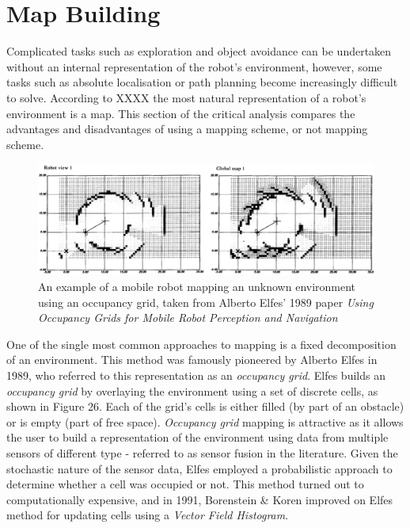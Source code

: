 \documentclass[a4paper]{article}
\begin{document}
\section{Map Building}
Complicated tasks such as exploration and object avoidance can be undertaken without an internal representation of the robot's environment, however, some tasks such as absolute localisation or path planning become increasingly difficult to solve. According to XXXX the most natural representation of a robot's environment is a map. This section of the critical analysis compares the advantages and disadvantages of using a mapping scheme, or not mapping scheme.
\begin{figure}[h]
\centering
\includegraphics[scale=0.3]{occupancy_grid}
\caption{An example of a mobile robot mapping an unknown environment using an occupancy grid, taken from Alberto Elfes' 1989 paper \textit{Using Occupancy Grids for Mobile Robot Perception and Navigation}}
\end{figure}

One of the single most common approaches to mapping is a fixed decomposition of an environment. This method was famously pioneered by Alberto Elfes in 1989, who referred to this representation as an \textit{occupancy grid}. Elfes builds an \textit{occupancy grid} by overlaying the environment using a set of discrete cells, as shown in Figure 26. Each of the grid's cells is either filled (by part of an obstacle) or is empty (part of free space). \textit{Occupancy grid} mapping is attractive as it allows the user to build a representation of the environment using data from multiple sensors of different type - referred to as sensor fusion in the literature. Given the stochastic nature of the sensor data, Elfes employed a probabilistic approach to determine whether a cell was occupied or not. This method turned out to computationally expensive, and in 1991, Borenstein \& Koren improved on Elfes method for updating cells using a \textit{Vector Field Histogram}.
\end{document}
